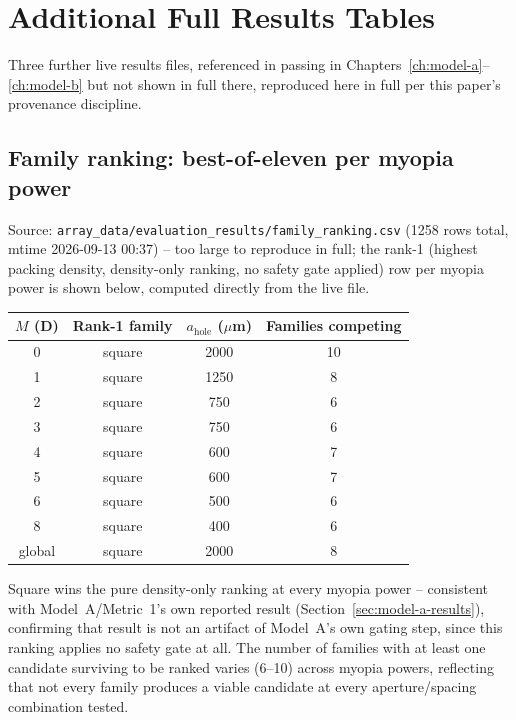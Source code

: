 \chapter{Additional Full Results Tables}
\label{ch:additional-tables}

Three further live results files, referenced in passing in
Chapters~\ref{ch:model-a}--\ref{ch:model-b} but not shown in full there, reproduced
here in full per this paper's provenance discipline.

\section{Family ranking: best-of-eleven per myopia power}
\label{sec:family-ranking-full}
Source: \texttt{array\_data/evaluation\_results/family\_ranking.csv} (1258 rows total,
mtime 2026-09-13 00:37) -- too large to reproduce in full; the rank-1 (highest packing
density, density-only ranking, no safety gate applied) row per myopia power is shown
below, computed directly from the live file.
\begin{center}
\begin{tabular}{cccc}
\toprule
$M$ (D) & Rank-1 family & $a_{\mathrm{hole}}$ ($\mu$m) & Families competing \\
\midrule
0 & square & 2000 & 10 \\
1 & square & 1250 & 8 \\
2 & square & 750 & 6 \\
3 & square & 750 & 6 \\
4 & square & 600 & 7 \\
5 & square & 600 & 7 \\
6 & square & 500 & 6 \\
8 & square & 400 & 6 \\
global & square & 2000 & 8 \\
\bottomrule
\end{tabular}
\end{center}
Square wins the pure density-only ranking at every myopia power -- consistent with
Model~A/Metric~1's own reported result (Section~\ref{sec:model-a-results}), confirming
that result is not an artifact of Model~A's own gating step, since this ranking applies
no safety gate at all. The number of families with at least one candidate surviving to
be ranked varies (6--10) across myopia powers, reflecting that not every family
produces a viable candidate at every aperture/spacing combination tested.

